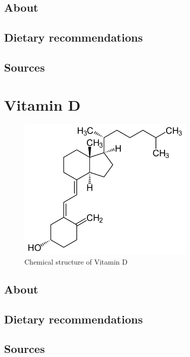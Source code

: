 \documentclass{book}
\begin{document}
\section{About}


\section{Dietary recommendations}


\section{Sources}


\chapter{Vitamin D}
\begin{figure}[h]
	\caption{Chemical structure of Vitamin D}
	\centering \includegraphics[width=0.75\textwidth]{images/Vitamin_D_chemical_structure}
\end{figure}
\newpage

\section{About}


\section{Dietary recommendations}


\section{Sources}
\end{document}
